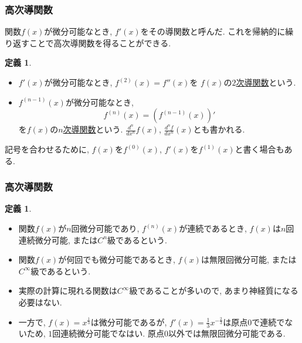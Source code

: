 \documentclass[dvipdfmx,cjk,10.2pt]{beamer}
\theoremstyle{definition}
\newtheorem{Def}[Thm]{定義}
\begin{document}
\begin{frame}
\frametitle{高次導関数}


関数$f(x)$が微分可能なとき, $f'(x)$をその導関数と呼んだ. 
これを帰納的に繰り返すことで高次導関数を得ることができる. 
\begin{Def}
\begin{itemize}
\item $f'(x)$が微分可能なとき, $f^{(2)}(x)=f''(x)$を $f(x)$の\underline{$2$次導関数}という. 
\item $f^{(n-1)}(x)$が微分可能なとき, 
$$
f^{(n)}(x)=(f^{(n-1)}(x))'
$$
を$f(x)$の\underline{$n$次導関数}という. $\frac{d^n}{dx^n}f(x)$, $\frac{d^nf}{dx^n}(x)$とも書かれる.  
\end{itemize}
\end{Def}

記号を合わせるために, $f(x)$を$f^{(0)}(x)$, $f'(x)$を$f^{(1)}(x)$と書く場合もある.  


\end{frame}







\begin{frame}
\frametitle{高次導関数}


\begin{Def}
\begin{itemize}
\item 関数$f(x)$が$n$回微分可能であり, $f^{(n)}(x)$が連続であるとき, $f(x)$は$n$回連続微分可能, または$C^n$級であるという. 
\item 関数$f(x)$が何回でも微分可能であるとき, $f(x)$は無限回微分可能, または$C^\infty$級であるという. 
\end{itemize}
\end{Def}

\begin{itemize}
\item 実際の計算に現れる関数は$C^\infty$級であることが多いので, あまり神経質になる必要はない. 
\item 一方で, $f(x)=x^{\frac{1}{3}}$は微分可能であるが, $f'(x)=\frac{1}{3}x^{-\frac{2}{3}}$は原点$0$で連続でないため, $1$回連続微分可能でなはい. 
原点$0$以外では無限回微分可能である. 
\end{itemize}

\end{frame}
\end{document}

